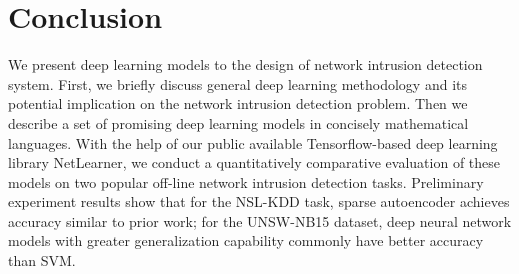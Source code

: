 \section{Conclusion}
We present deep learning models to the design of network intrusion detection system.
First, we briefly discuss general deep learning methodology and
its potential implication on the network intrusion detection problem.
Then we describe a set of promising deep learning models in concisely mathematical languages.
With the help of our public available Tensorflow-based deep learning library NetLearner,
we conduct a quantitatively comparative evaluation of these models on two popular
off-line network intrusion detection tasks. 
Preliminary experiment results show that for the NSL-KDD task, sparse autoencoder achieves accuracy similar to prior work;
for the UNSW-NB15 dataset, deep neural network models with greater generalization capability commonly have better accuracy than SVM.
